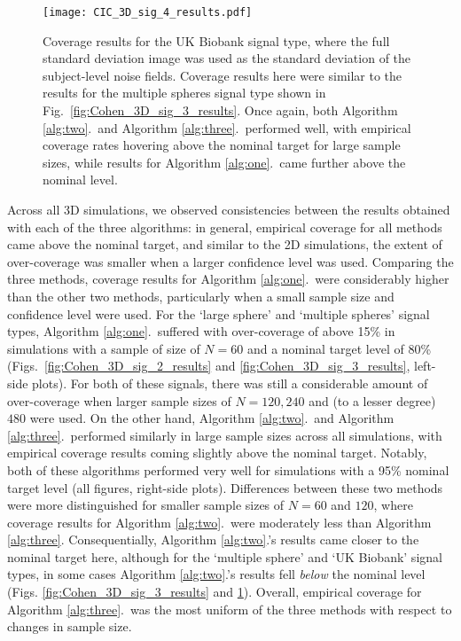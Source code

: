 \begin{figure}[!htbp]
\hspace*{-3.0cm}
\centering
    \texttt{[image: CIC\_3D\_sig\_4\_results.pdf]}
\caption{Coverage results for the UK Biobank signal type, where the full standard deviation image was used as the standard deviation of the subject-level noise fields. Coverage results here were similar to the results for the multiple spheres signal type shown in Fig.\ \ref{fig:Cohen_3D_sig_3_results}. Once again, both Algorithm \ref{alg:two}.\ and Algorithm \ref{alg:three}.\ performed well, with empirical coverage rates hovering above the nominal target for large sample sizes, while results for Algorithm \ref{alg:one}.\ came further above the nominal level.}
\label{fig:Cohen_3D_sig_4_results}
\end{figure}

Across all 3D simulations, we observed consistencies between the results obtained with each of the three algorithms: in general, empirical coverage for all methods came above the nominal target, and similar to the 2D simulations, the extent of over-coverage was smaller when a larger confidence level was used. Comparing the three methods, coverage results for Algorithm \ref{alg:one}.\ were considerably higher than the other two methods, particularly when a small sample size and confidence level were used. For the `large sphere' and `multiple spheres' signal types, Algorithm \ref{alg:one}.\ suffered with over-coverage of above 15\% in simulations with a sample of size of $N = 60$ and a nominal target level of 80\% (Figs.\ \ref{fig:Cohen_3D_sig_2_results} and \ref{fig:Cohen_3D_sig_3_results}, left-side plots). For both of these signals, there was still a considerable amount of over-coverage when larger sample sizes of $N = 120, 240$ and (to a lesser degree) $480$ were used. On the other hand, Algorithm \ref{alg:two}.\ and Algorithm \ref{alg:three}.\ performed similarly in large sample sizes across all simulations, with empirical coverage results coming slightly above the nominal target. Notably, both of these algorithms performed very well for simulations with a 95\% nominal target level (all figures, right-side plots).
Differences between these two methods were more distinguished for smaller sample sizes of $N = 60$ and $120$, where coverage results for Algorithm \ref{alg:two}.\ were moderately less than Algorithm \ref{alg:three}. Consequentially, Algorithm \ref{alg:two}.'s results came closer to the nominal target here, although for the `multiple sphere' and `UK Biobank' signal types, in some cases Algorithm \ref{alg:two}.'s results fell \textit{below} the nominal level (Figs. \ref{fig:Cohen_3D_sig_3_results} and \ref{fig:Cohen_3D_sig_4_results}). Overall, empirical coverage for Algorithm \ref{alg:three}.\ was the most uniform of the three methods with respect to changes in sample size. 

